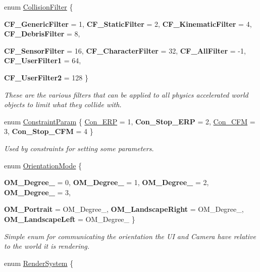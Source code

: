 \begin{DoxyCompactItemize}
enum \hyperlink{namespaceMezzanine_a475283a31c5df11f18e059953f32ace2}{CollisionFilter} \{ \par
{\bfseries CF\_\-GenericFilter} =  1, 
{\bfseries CF\_\-StaticFilter} =  2, 
{\bfseries CF\_\-KinematicFilter} =  4, 
{\bfseries CF\_\-DebrisFilter} =  8, 
\par
{\bfseries CF\_\-SensorFilter} =  16, 
{\bfseries CF\_\-CharacterFilter} =  32, 
{\bfseries CF\_\-AllFilter} =  -\/1, 
{\bfseries CF\_\-UserFilter1} =  64, 
\par
{\bfseries CF\_\-UserFilter2} =  128
 \}
\begin{DoxyCompactList}\small\item\em These are the various filters that can be applied to all physics accelerated world objects to limit what they collide with. \item\end{DoxyCompactList}\item 
enum \hyperlink{namespaceMezzanine_a6c62e8c2938fb203eb7a7072c12176f4}{ConstraintParam} \{ \hyperlink{namespaceMezzanine_a6c62e8c2938fb203eb7a7072c12176f4aa7c686c7bf5328e60c31d6ab05c3dc90}{Con\_\-ERP} =  1, 
{\bfseries Con\_\-Stop\_\-ERP} =  2, 
\hyperlink{namespaceMezzanine_a6c62e8c2938fb203eb7a7072c12176f4a0ae9de16fc96d34ee601f9516d43b9b8}{Con\_\-CFM} =  3, 
{\bfseries Con\_\-Stop\_\-CFM} =  4
 \}
\begin{DoxyCompactList}\small\item\em Used by constraints for setting some parameters. \item\end{DoxyCompactList}\item 
enum \hyperlink{namespaceMezzanine_a8892173bd6aaf7d0e34a07b2b30aad33}{OrientationMode} \{ \par
{\bfseries OM\_\-Degree\_} =  0, 
{\bfseries OM\_\-Degree\_} =  1, 
{\bfseries OM\_\-Degree\_} =  2, 
{\bfseries OM\_\-Degree\_} =  3, 
\par
{\bfseries OM\_\-Portrait} =  OM\_\-Degree\_, 
{\bfseries OM\_\-LandscapeRight} =  OM\_\-Degree\_, 
{\bfseries OM\_\-LandscapeLeft} =  OM\_\-Degree\_
 \}
\begin{DoxyCompactList}\small\item\em Simple enum for communicating the orientation the UI and Camera have relative to the world it is rendering. \item\end{DoxyCompactList}\item 
enum \hyperlink{namespaceMezzanine_a1bb0347c37954bc71c4344e4b55c729a}{RenderSystem} \{ \par

\end{DoxyCompactItemize}

